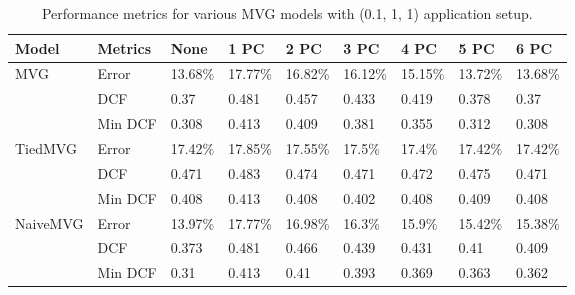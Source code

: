 \documentclass{article}
\begin{document}
\begin{table}[ht]
    \centering
    \begin{tabularx}{\textwidth}{ll*{7}{X}}
        \toprule
        \textbf{Model} & \textbf{Metrics} & \textbf{None} & \textbf{1 PC} & \textbf{2 PC} & \textbf{3 PC} & \textbf{4 PC} & \textbf{5 PC} & \textbf{6 PC} \\
        \midrule
        \multirow{3}{*}{MVG} & Error & 13.68\% & 17.77\% & 16.82\% & 16.12\% & 15.15\% & 13.72\% & 13.68\% \\
                              & DCF & 0.37 & 0.481 & 0.457 & 0.433 & 0.419 & 0.378 & 0.37 \\
                              & Min DCF & 0.308 & 0.413 & 0.409 & 0.381 & 0.355 & 0.312 & 0.308 \\
        \midrule
        \multirow{3}{*}{TiedMVG} & Error & 17.42\% & 17.85\% & 17.55\% & 17.5\% & 17.4\% & 17.42\% & 17.42\% \\
                                 & DCF & 0.471 & 0.483 & 0.474 & 0.471 & 0.472 & 0.475 & 0.471 \\
                                 & Min DCF & 0.408 & 0.413 & 0.408 & 0.402 & 0.408 & 0.409 & 0.408 \\
        \midrule
        \multirow{3}{*}{NaiveMVG} & Error & 13.97\% & 17.77\% & 16.98\% & 16.3\% & 15.9\% & 15.42\% & 15.38\% \\
                                  & DCF & 0.373 & 0.481 & 0.466 & 0.439 & 0.431 & 0.41 & 0.409 \\
                                  & Min DCF & 0.31 & 0.413 & 0.41 & 0.393 & 0.369 & 0.363 & 0.362 \\
        \bottomrule
    \end{tabularx}
    \caption{Performance metrics for various MVG models with (0.1, 1, 1) application setup.}
    \label{tab:mvg_performance_1_1_1}
\end{table}
\end{document}
